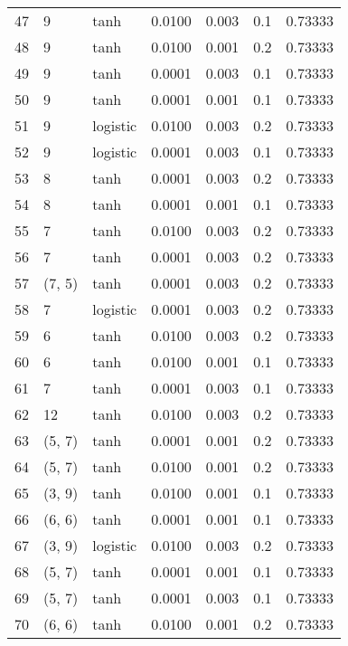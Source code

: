 \begin{tabular}{lllrrrr}
47  &           9 &      tanh &  0.0100 &  0.003 &  0.1 &   0.73333 \\
48  &           9 &      tanh &  0.0100 &  0.001 &  0.2 &   0.73333 \\
49  &           9 &      tanh &  0.0001 &  0.003 &  0.1 &   0.73333 \\
50  &           9 &      tanh &  0.0001 &  0.001 &  0.1 &   0.73333 \\
51  &           9 &  logistic &  0.0100 &  0.003 &  0.2 &   0.73333 \\
52  &           9 &  logistic &  0.0001 &  0.003 &  0.1 &   0.73333 \\
53  &           8 &      tanh &  0.0001 &  0.003 &  0.2 &   0.73333 \\
54  &           8 &      tanh &  0.0001 &  0.001 &  0.1 &   0.73333 \\
55  &           7 &      tanh &  0.0100 &  0.003 &  0.2 &   0.73333 \\
56  &           7 &      tanh &  0.0001 &  0.003 &  0.2 &   0.73333 \\
57  &      (7, 5) &      tanh &  0.0001 &  0.003 &  0.2 &   0.73333 \\
58  &           7 &  logistic &  0.0001 &  0.003 &  0.2 &   0.73333 \\
59  &           6 &      tanh &  0.0100 &  0.003 &  0.2 &   0.73333 \\
60  &           6 &      tanh &  0.0100 &  0.001 &  0.1 &   0.73333 \\
61  &           7 &      tanh &  0.0001 &  0.003 &  0.1 &   0.73333 \\
62  &          12 &      tanh &  0.0100 &  0.003 &  0.2 &   0.73333 \\
63  &      (5, 7) &      tanh &  0.0001 &  0.001 &  0.2 &   0.73333 \\
64  &      (5, 7) &      tanh &  0.0100 &  0.001 &  0.2 &   0.73333 \\
65  &      (3, 9) &      tanh &  0.0100 &  0.001 &  0.1 &   0.73333 \\
66  &      (6, 6) &      tanh &  0.0001 &  0.001 &  0.1 &   0.73333 \\
67  &      (3, 9) &  logistic &  0.0100 &  0.003 &  0.2 &   0.73333 \\
68  &      (5, 7) &      tanh &  0.0001 &  0.001 &  0.1 &   0.73333 \\
69  &      (5, 7) &      tanh &  0.0001 &  0.003 &  0.1 &   0.73333 \\
70  &      (6, 6) &      tanh &  0.0100 &  0.001 &  0.2 &   0.73333 \\

\end{tabular}
